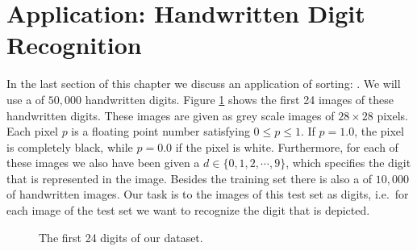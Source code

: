 \section{Application: Handwritten Digit Recognition}
In the last section of this chapter we discuss an application of sorting:
.
We will use a  of $50,000$ handwritten digits. Figure \ref{fig:digits.pdf} shows the first 24
images of these handwritten digits.  These images are given as grey scale images of $28 \times 28$ pixels.
Each pixel $p$ is a floating point number satisfying $0 \leq p \leq 1$. If $p = 1.0$, the pixel is completely
black, while $p = 0.0$ if the pixel is white.  Furthermore, for each of these images we also have been given a
 $d \in \{0,1,2,\cdots,9\}$, which specifies the digit that is represented in the image.  Besides the training set 
there is also a  of $10,000$ of handwritten images.  Our task is to  the images
of this test set as digits, i.e.~for each image of the test set we want to recognize the digit that is depicted.


\begin{figure}[!ht]
  \centering
  \caption{The first 24 digits of our dataset.}
  \label{fig:digits.pdf}
\end{figure}

